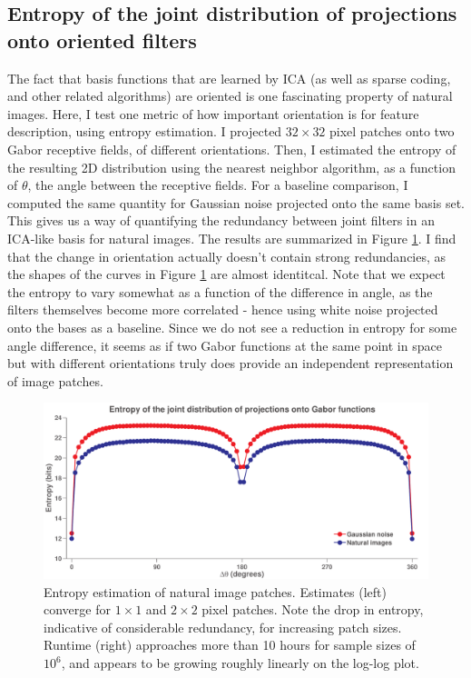 \documentclass[10pt,twocolumn,letterpaper]{article}
\begin{document}
\subsection{Entropy of the joint distribution of projections onto oriented filters}
The fact that basis functions that are learned by ICA (as well as sparse coding, and other related algorithms) are oriented is one fascinating property of natural images.
Here, I test one metric of how important orientation is for feature description, using entropy estimation.
I projected $32\times 32$ pixel patches onto two Gabor receptive fields, of different orientations.
Then, I estimated the entropy of the resulting 2D distribution using the nearest neighbor algorithm, as a function of $\theta$, the angle between the receptive fields.
For a baseline comparison, I computed the same quantity for Gaussian noise projected onto the same basis set.
This gives us a way of quantifying the redundancy between joint filters in an ICA-like basis for natural images.
The results are summarized in Figure \ref{fig:jointent}.
I find that the change in orientation actually doesn't contain strong redundancies, as the shapes of the curves in Figure \ref{fig:jointent} are almost identitcal. Note that we expect the entropy to vary somewhat as a function of the difference in angle, as the filters themselves become more correlated - hence using white noise projected onto the bases as a baseline. Since we do not see a reduction in entropy for some angle difference, it seems as if two Gabor functions at the same point in space but with different orientations truly does provide an independent representation of image patches.

\begin{figure}[h]
\begin{center}
   \includegraphics[width=1.0\linewidth]{jointent.pdf}
   \caption{Entropy estimation of natural image patches. Estimates (left) converge for $1\times 1$ and $2\times 2$ pixel patches. Note the drop in entropy, indicative of considerable redundancy, for increasing patch sizes. Runtime (right) approaches more than 10 hours for sample sizes of $10^6$, and appears to be growing roughly linearly on the log-log plot.}
\label{fig:jointent}
\end{center}
\end{figure}
\end{document}
